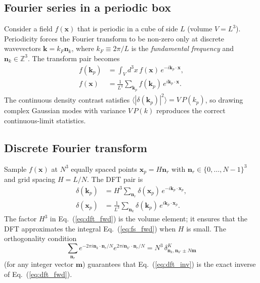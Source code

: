 \documentclass[12pt]{article}
\newcommand{\bx}{\mathbf{x}}
\newcommand{\bk}{\mathbf{k}}
\begin{document}
\subsection{Fourier series in a periodic box}
\label{app:fft_series}

Consider a field $f(\bx)$ that is periodic in a cube of side $L$
(volume $V = L^3$).  Periodicity forces the Fourier transform to be
non-zero only at discrete wavevectors
$\bk = k_F\mathbf{n}_k$, where $k_F \equiv 2\pi/L$ is the
\emph{fundamental frequency} and $\mathbf{n}_k\in\mathbb{Z}^3$.
The transform pair becomes
%
\begin{align}
  f(\bk_p) &= \int_V d^3x\, f(\bx)\,e^{-i\bk_p\cdot\bx},
  \label{eq:fs_fwd}\\
  f(\bx)   &= \frac{1}{L^3}\sum_{\bk_p} f(\bk_p)\,e^{i\bk_p\cdot\bx}.
  \label{eq:fs_inv}
\end{align}
%
The continuous density contrast satisfies
$\langle|\delta(\bk_p)|^2\rangle = V\,P(k_p)$,
so drawing complex Gaussian modes with variance $V\,P(k)$ reproduces
the correct continuous-limit statistics.

\subsection{Discrete Fourier transform}
\label{app:fft_dft}

Sample $f(\bx)$ at $N^3$ equally spaced points $\bx_p = H\mathbf{n}_r$
with $\mathbf{n}_r\in\{0,\ldots,N-1\}^3$ and grid spacing $H = L/N$.
The DFT pair is
%
\begin{align}
  \delta(\bk_p) &= H^3 \sum_{\mathbf{n}_r}
      \delta(\bx_p)\,e^{-i\bk_p\cdot\bx_p},
  \label{eq:dft_fwd}\\
  \delta(\bx_p) &= \frac{1}{L^3}\sum_{\mathbf{n}_k}
      \delta(\bk_p)\,e^{i\bk_p\cdot\bx_p}.
  \label{eq:dft_inv}
\end{align}
%
The factor $H^3$ in Eq.~(\ref{eq:dft_fwd}) is the volume element; it
ensures that the DFT approximates the integral
Eq.~(\ref{eq:fs_fwd}) when $H$ is small.  The orthogonality condition
%
\begin{equation}
  \sum_{\mathbf{n}_r}
    e^{-2\pi i\mathbf{n}_k\cdot\mathbf{n}_r/N}
    e^{2\pi i\mathbf{n}_{k'}\cdot\mathbf{n}_r/N}
    = N^3\,\delta^K_{\mathbf{n}_k,\mathbf{n}_{k'}\pm N\mathbf{m}}
  \label{eq:dft_orth}
\end{equation}
%
(for any integer vector $\mathbf{m}$) guarantees that
Eq.~(\ref{eq:dft_inv}) is the exact inverse of Eq.~(\ref{eq:dft_fwd}).
\end{document}
